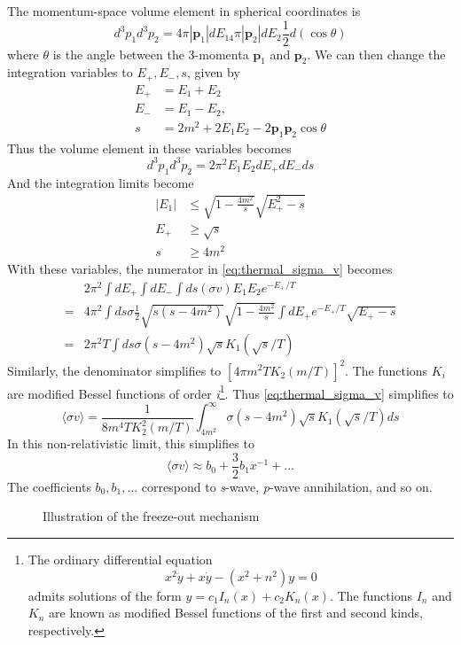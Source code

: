 The momentum-space volume element in spherical coordinates is
\[d^3p_1d^3p_2 = 4\pi |\mathbf{p}_1|dE_14\pi |\mathbf{p}_2|dE_2\frac{1}{2}d(\cos\theta)\]
where $\theta$ is the angle between the 3-momenta $\mathbf{p}_1$ and $\mathbf{p}_2$. We can then change the integration variables to $E_+, E_-, s$, given by
\begin{align}
  E_+ &= E_1 + E_2\\
  E_- &= E_1 - E_2,\\
  s &= 2m^2 + 2E_1E_2-2\mathbf{p}_1\mathbf{p}_2\cos\theta
\end{align}
Thus the volume element in these variables becomes
\[d^3p_1d^3p_2 = 2\pi^2E_1E_2dE_+dE_-ds\]
And the integration limits become
\begin{align}
  |E_1| &\leq \sqrt{1-\frac{4m^2}{s}}\sqrt{E_+^2 - s}\\
  E_+ &\geq \sqrt{s}\\
  s &\geq 4m^2
\end{align}
With these variables, the numerator in \autoref{eq:thermal_sigma_v} becomes
\begin{align*}
  &2\pi^2\int dE_+\int dE_-\int ds(\sigma v)E_1E_2e^{-E_+/T}\\
  =&4\pi^2\int ds\sigma \frac{1}{2}\sqrt{s(s-4m^2)}\sqrt{1-\frac{4m^2}{s}}\int dE_+e^{-E_+/T}\sqrt{E_+-s}\\
  =&2\pi^2T\int ds\sigma(s-4m^2)\sqrt{s}K_1(\sqrt{s}/T)
\end{align*}
Similarly, the denominator simplifies to $[4\pi m^2TK_2(m/T)]^2$. The functions $K_i$ are modified Bessel functions of order \emph{i}\footnote{The ordinary differential equation
  \begin{equation*}
    x^2\ddot{y} + x\dot{y} - (x^2+n^2)y = 0
  \end{equation*}
  admits solutions of the form $y = c_1 I_n(x) + c_2K_n(x)$. The functions $I_n$ and $K_n$ are known as modified Bessel functions of the first and second kinds, respectively.
}. Thus \autoref{eq:thermal_sigma_v} simplifies to
\[\langle\sigma v\rangle = \frac{1}{8m^4TK_2^2(m/T)}\int_{4m^2}^\infty\sigma(s-4m^2)\sqrt{s}K_1(\sqrt{s}/T)ds\]
In this non-relativistic limit, this simplifies to
\[\langle\sigma v\rangle \approx b_0 + \frac{3}{2}b_1x^{-1} + ...\]
The coefficients $b_0, b_1, ...$ correspond to \emph{s}-wave, \emph{p}-wave annihilation, and so on.
\begin{figure}
    
  \caption{Illustration of the freeze-out mechanism}
\end{figure}
